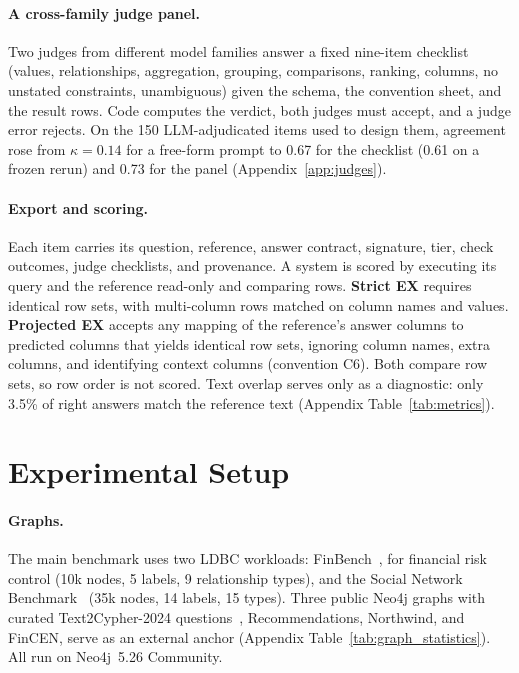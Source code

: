 \documentclass[11pt]{article}
\begin{document}
\paragraph{A cross-family judge panel.} Two judges from different model families answer a fixed nine-item checklist (values, relationships, aggregation, grouping, comparisons, ranking, columns, no unstated constraints, unambiguous) given the schema, the convention sheet, and the result rows. Code computes the verdict, both judges must accept, and a judge error rejects. On the 150 LLM-adjudicated items used to design them, agreement rose from $\kappa=0.14$ for a free-form prompt to 0.67 for the checklist (0.61 on a frozen rerun) and 0.73 for the panel (Appendix~\ref{app:judges}).

\paragraph{Export and scoring.} Each item carries its question, reference, answer contract, signature, tier, check outcomes, judge checklists, and provenance. A system is scored by executing its query and the reference read-only and comparing rows. \textbf{Strict EX} requires identical row sets, with multi-column rows matched on column names and values. \textbf{Projected EX} accepts any mapping of the reference's answer columns to predicted columns that yields identical row sets, ignoring column names, extra columns, and identifying context columns (convention C6). Both compare row sets, so row order is not scored. Text overlap serves only as a diagnostic: only 3.5\% of right answers match the reference text (Appendix Table~\ref{tab:metrics}).

\section{Experimental Setup}
\label{sec:setup}
\paragraph{Graphs.} The main benchmark uses two LDBC workloads: FinBench~\citep{ldbcfinbench}, for financial risk control (10k nodes, 5 labels, 9 relationship types), and the Social Network Benchmark~\citep{ldbcsnb} (35k nodes, 14 labels, 15 types). Three public Neo4j graphs with curated Text2Cypher-2024 questions~\citep{text2cypher2024dataset}, Recommendations, Northwind, and FinCEN, serve as an external anchor (Appendix Table~\ref{tab:graph_statistics}). All run on Neo4j~5.26 Community.
\end{document}
